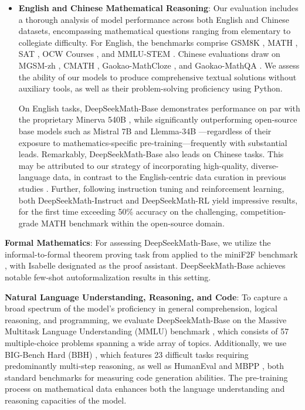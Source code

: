 \begin{itemize}[topsep=0pt]
    \item \textbf{English and Chinese Mathematical Reasoning}: Our evaluation includes a thorough analysis of model performance across both English and Chinese datasets, encompassing mathematical questions ranging from elementary to collegiate difficulty. For English, the benchmarks comprise GSM8K \citep{gsm8k}, MATH \citep{MATH}, SAT \citep{llemma}, OCW Courses \citep{minerva}, and MMLU-STEM \citep{mmlu}. Chinese evaluations draw on MGSM-zh \citep{mgsm}, CMATH \citep{wei2023cmath}, Gaokao-MathCloze \citep{agieval}, and Gaokao-MathQA \citep{agieval}. We assess the ability of our models to produce comprehensive textual solutions without auxiliary tools, as well as their problem-solving proficiency using Python.

    On English tasks, DeepSeekMath-Base demonstrates performance on par with the proprietary Minerva 540B \citep{minerva}, while significantly outperforming open-source base models such as Mistral 7B \citep{mistral} and Llemma-34B \citep{llemma}—regardless of their exposure to mathematics-specific pre-training—frequently with substantial leads. Remarkably, DeepSeekMath-Base also leads on Chinese tasks. This may be attributed to our strategy of incorporating high-quality, diverse-language data, in contrast to the English-centric data curation in previous studies \citep{minerva,llemma}. Further, following instruction tuning and reinforcement learning, both DeepSeekMath-Instruct and DeepSeekMath-RL yield impressive results, for the first time exceeding 50\% accuracy on the challenging, competition-grade MATH benchmark within the open-source domain.
\end{itemize}

\item \textbf{Formal Mathematics}: For assessing DeepSeekMath-Base, we utilize the informal-to-formal theorem proving task from \citep{dsp_proof} applied to the miniF2F benchmark \citep{minif2f}, with Isabelle \citep{isabelle} designated as the proof assistant. DeepSeekMath-Base achieves notable few-shot autoformalization results in this setting.

\item \textbf{Natural Language Understanding, Reasoning, and Code}: To capture a broad spectrum of the model’s proficiency in general comprehension, logical reasoning, and programming, we evaluate DeepSeekMath-Base on the Massive Multitask Language Understanding (MMLU) benchmark \citep{mmlu}, which consists of 57 multiple-choice problems spanning a wide array of topics. Additionally, we use BIG-Bench Hard (BBH) \citep{bbh}, which features 23 difficult tasks requiring predominantly multi-step reasoning, as well as HumanEval \citep{codex} and MBPP \citep{mbpp}, both standard benchmarks for measuring code generation abilities. The pre-training process on mathematical data enhances both the language understanding and reasoning capacities of the model.

